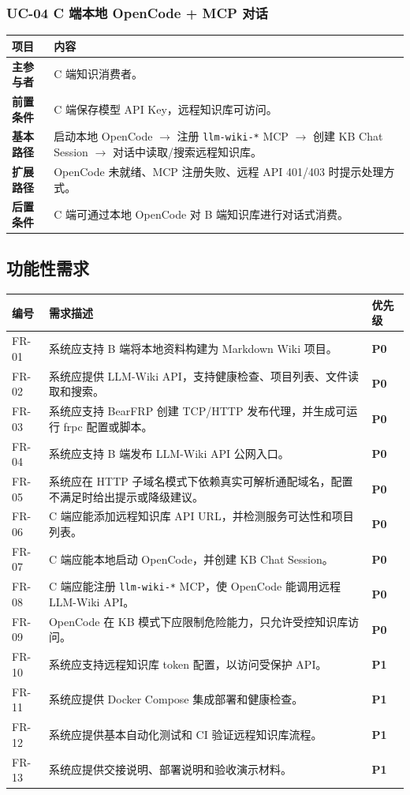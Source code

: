 \documentclass[UTF8,a4paper,12pt,fontset=fandol]{ctexart}
\newcommand{\code}[1]{\begingroup\urlstyle{tt}\footnotesize\nolinkurl{#1}\endgroup}
\newcommand{\priority}[1]{\textcolor{whu}{\bfseries #1}}
\begin{document}
\subsubsection{UC-04 C 端本地 OpenCode + MCP 对话}
\begin{longtable}{>{\bfseries}p{3.0cm}p{11.2cm}}
\toprule
项目 & 内容 \\
\midrule
主参与者 & C 端知识消费者。 \\
前置条件 & C 端保存模型 API Key，远程知识库可访问。 \\
基本路径 & 启动本地 OpenCode $\rightarrow$ 注册 \code{llm-wiki-*} MCP $\rightarrow$ 创建 KB Chat Session $\rightarrow$ 对话中读取/搜索远程知识库。 \\
扩展路径 & OpenCode 未就绪、MCP 注册失败、远程 API 401/403 时提示处理方式。 \\
后置条件 & C 端可通过本地 OpenCode 对 B 端知识库进行对话式消费。 \\
\bottomrule
\end{longtable}

\subsection{功能性需求}
\begin{longtable}{>{\centering\arraybackslash}p{1.6cm}p{10.8cm}>{\centering\arraybackslash}p{1.4cm}}
\toprule
编号 & 需求描述 & 优先级 \\
\midrule
FR-01 & 系统应支持 B 端将本地资料构建为 Markdown Wiki 项目。 & \priority{P0} \\
FR-02 & 系统应提供 LLM-Wiki API，支持健康检查、项目列表、文件读取和搜索。 & \priority{P0} \\
FR-03 & 系统应支持 BearFRP 创建 TCP/HTTP 发布代理，并生成可运行 frpc 配置或脚本。 & \priority{P0} \\
FR-04 & 系统应支持 B 端发布 LLM-Wiki API 公网入口。 & \priority{P0} \\
FR-05 & 系统应在 HTTP 子域名模式下依赖真实可解析通配域名，配置不满足时给出提示或降级建议。 & \priority{P0} \\
FR-06 & C 端应能添加远程知识库 API URL，并检测服务可达性和项目列表。 & \priority{P0} \\
FR-07 & C 端应能本地启动 OpenCode，并创建 KB Chat Session。 & \priority{P0} \\
FR-08 & C 端应能注册 \code{llm-wiki-*} MCP，使 OpenCode 能调用远程 LLM-Wiki API。 & \priority{P0} \\
FR-09 & OpenCode 在 KB 模式下应限制危险能力，只允许受控知识库访问。 & \priority{P0} \\
FR-10 & 系统应支持远程知识库 token 配置，以访问受保护 API。 & \priority{P1} \\
FR-11 & 系统应提供 Docker Compose 集成部署和健康检查。 & \priority{P1} \\
FR-12 & 系统应提供基本自动化测试和 CI 验证远程知识库流程。 & \priority{P1} \\
FR-13 & 系统应提供交接说明、部署说明和验收演示材料。 & \priority{P1} \\
\bottomrule
\end{longtable}
\end{document}
